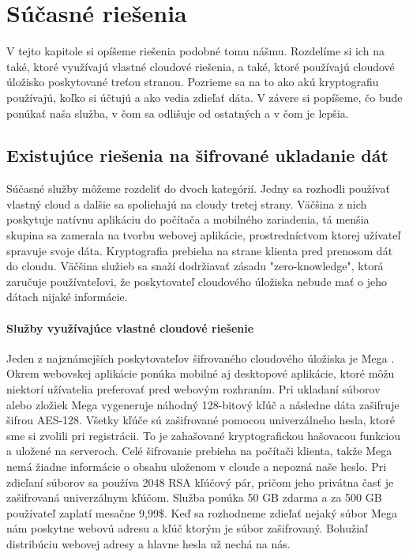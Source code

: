 \chapter{Súčasné riešenia}

V tejto kapitole si opíšeme riešenia podobné tomu nášmu. Rozdelíme si ich na také, ktoré využívajú vlastné cloudové riešenia, a také, ktoré používajú cloudové úložisko poskytované treťou stranou. Pozrieme sa na to ako akú kryptografiu používajú, koľko si účtujú a ako vedia zdieľať dáta. V závere si popíšeme, čo bude ponúkať naša služba, v čom sa odlišuje od ostatných a v čom je lepšia.
	
\section{Existujúce riešenia na šifrované ukladanie dát}
	Súčasné služby môžeme rozdeliť do dvoch kategórií. Jedny sa rozhodli používať vlastný cloud a dalšie sa spoliehajú na cloudy tretej strany. Väčšina z nich poskytuje natívnu aplikáciu do počítača a mobilného zariadenia, tá menšia skupina sa zamerala na tvorbu webovej aplikácie, prostredníctvom ktorej užívateľ spravuje svoje dáta. Kryptografia prebieha na strane klienta pred prenosom dát do cloudu. Väčšina služieb sa snaží dodržiavať zásadu "zero-knowledge", ktorá zaručuje používateľovi, že poskytovateľ cloudového úložiska nebude mať o jeho dátach nijaké informácie. 
	
	\subsubsection{Služby využívajúce vlastné cloudové riešenie}
		Jeden z najznámejších poskytovateľov šifrovaného cloudového úložiska je Mega \cite{mega}. Okrem webovskej aplikácie ponúka mobilné aj desktopové aplikácie, ktoré môžu niektorí užívatelia preferovať pred webovým rozhraním. Pri ukladaní súborov alebo zložiek Mega vygeneruje náhodný 128-bitový kľúč a následne dáta zašifruje šifrou AES-128. Všetky kľúče sú zašifrované pomocou univerzálneho hesla, ktoré sme si zvolili pri registrácii. To je zahašované kryptografickou hašovacou funkciou a uložené na serveroch. Celé šifrovanie prebieha na počítači klienta, takže Mega nemá žiadne informácie o obsahu uloženom v cloude a nepozná naše heslo. Pri zdieľaní súborov sa používa 2048 RSA kľúčový pár, pričom jeho privátna časť je zašifrovaná univerzálnym kľúčom. Služba ponúka 50 GB zdarma a za 500 GB používateľ zaplatí mesačne 9,99\$. Keď sa rozhodneme zdieľať nejaký súbor Mega nám poskytne webovú adresu a kľúč ktorým je súbor zašifrovaný. Bohužiaľ distribúciu webovej adresy a hlavne hesla už nechá na nás.
		
